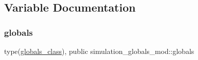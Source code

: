 \subsection{Variable Documentation}
\mbox{\label{namespacesimulation__globals__mod_a04123075b6de525703edb89697fc39e9}} 
\subsubsection{\texorpdfstring{globals}{globals}}
{\footnotesize\ttfamily type(\hyperlink{structsimulation__globals__mod_1_1globals__class}{globals\+\_\+class}), public simulation\+\_\+globals\+\_\+mod\+::globals}

